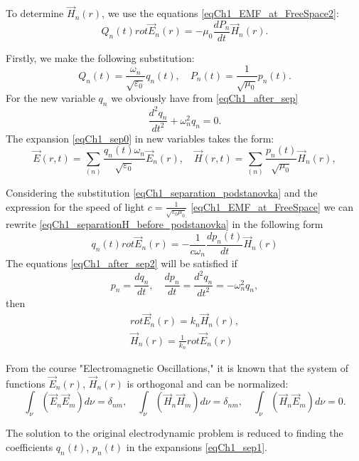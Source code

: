To determine $\vec{H}_n\left(r\right)$, we use the equations 
\eqref{eqCh1_EMF_at_FreeSpace2}:
\begin{equation}
Q_n\left(t\right)  rot
\vec{E}_n\left(r\right) = -\mu_0 \frac{d P_n}{d t}
\vec{H}_n\left(r\right).
\label{eqCh1_separationH_before_podstanovka}
\end{equation}

Firstly, we make the following substitution:
\begin{equation}
Q_n\left(t\right) = \frac{\omega_n}{\sqrt{\varepsilon_0}}q_n\left(t\right),
\quad
P_n\left(t\right) = \frac{1}{\sqrt{\mu_0}}p_n\left(t\right).
\label{eqCh1_separation_podstanovka}
\end{equation}
For the new variable $q_n$ we obviously have from \eqref{eqCh1_after_sep}
\[
\frac{d^2 q_n}{d t^2} + \omega_n^2 q_n = 0.
\]
The expansion \eqref{eqCh1_sep0} in new variables takes the form:
\begin{equation}
\vec{E}\left(r, t\right) = \sum_{(n)}
\frac{q_n\left(t\right) \omega_n}{\sqrt{\varepsilon_0}} \vec{E}_n\left(r\right),
\quad
\vec{H}\left(r, t\right) = \sum_{(n)}
\frac{p_n\left(t\right)}{\sqrt{\mu_0}} \vec{H}_n\left(r\right),
\label{eqCh1_sep1}
\end{equation}

Considering the substitution \eqref{eqCh1_separation_podstanovka} and the expression for the speed of light $c =   \frac{1}{\sqrt{\varepsilon_0 \mu_0}}$
\eqref{eqCh1_EMF_at_FreeSpace} we can rewrite 
\eqref{eqCh1_separationH_before_podstanovka} in the following form 
\begin{equation}
q_n\left(t\right) rot \vec{E}_n\left(r\right) = - \frac{1}{c \omega_n}
\frac{d p_n\left(t\right)}{d t} \vec{H}_n\left(r\right)
\label{eqCh1_after_sep2}
\end{equation}
The equations \eqref{eqCh1_after_sep2} will be satisfied if  
\[
p_n = \frac{d q_n}{d t}, \quad \frac{d p_n}{d t} = 
\frac{d^2 q_n}{d t^2} = - \omega_n^2 q_n,
\]
then
\begin{eqnarray}
rot \vec{E}_n\left(r\right) = k_n \vec{H}_n\left(r\right),
\nonumber \\
\vec{H}_n\left(r\right) =  \frac{1}{k_n} rot \vec{E}_n\left(r\right)
\end{eqnarray}

From the course "Electromagnetic Oscillations," it is known that the system of functions  
$\vec{E}_n\left(r\right)$, $\vec{H}_n\left(r\right)$ is orthogonal and can be normalized: 
\begin{equation}
\int_{\nu} \left( \vec{E}_n \vec{E}_m \right) d \nu = \delta_{nm},
\quad
\int_{\nu} \left( \vec{H}_n \vec{H}_m \right) d \nu = \delta_{nm},
\quad
\int_{\nu} \left( \vec{H}_n \vec{E}_m \right) d \nu = 0.
\label{eqCh1_task1}
\end{equation}

The solution to the original electrodynamic problem is reduced to finding the coefficients $q_n\left(t\right)$, $p_n\left(t\right)$    
in the expansions \eqref{eqCh1_sep1}.